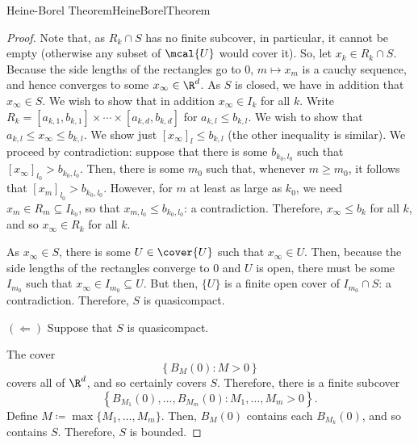 \begin{thm}{Heine-Borel Theorem}{HeineBorelTheorem}
\begin{proof}
Note that, as $R_k\cap S$ has no finite subcover, in particular, it cannot be empty (otherwise any subset of $\mcal{U}$ would cover it).  So, let $x_k\in R_k\cap S$.  Because the side lengths of the rectangles go to $0$, $m\mapsto x_m$ is a cauchy sequence, and hence converges to some $x_\infty \in \R ^d$.  As $S$ is closed, we have in addition that $x_\infty \in S$.  We wish to show that in addition $x_\infty \in I_k$ for all $k$.  Write $R_k=[a_{k,1},b_{k,1}]\times \cdots \times [a_{k,d},b_{k,d}]$ for $a_{k,l}\leq b_{k,l}$.  We wish to show that $a_{k,l}\leq x_\infty \leq b_{k,l}$.  We show just $[x_\infty] _l\leq b_{k,l}$ (the other inequality is similar).  We proceed by contradiction:  suppose that there is some $b_{k_0,l_0}$ such that $[x_\infty ]_{l_0}>b_{k_0,l_0}$.  Then, there is some $m_0$ such that, whenever $m\geq m_0$, it follows that $[x_m]_{l_0}>b_{k_0,l_0}$.  However, for $m$ at least as large as $k_0$, we need $x_m\in R_m\subseteq I_{k_0}$, so that $x_{m,l_0}\leq b_{k_0,l_0}$:  a contradiction.  Therefore, $x_\infty \leq b_k$ for all $k$, and so $x_\infty \in R_k$ for all $k$.

As $x_\infty \in S$, there is some $U\in \cover{U}$ such that $x_\infty \in U$.  Then, because the side lengths of the rectangles converge to $0$ and $U$ is open, there must be some $I_{m_0}$ such that $x_\infty \in I_{m_0}\subseteq U$.  But then, $\{ U\}$ is a finite open cover of $I_{m_0}\cap S$:  a contradiction.  Therefore, $S$ is quasicompact.

\blankline
\noindent
$(\Leftarrow )$
Suppose that $S$ is quasicompact.

The cover
\begin{equation}
\left\{ B_M(0):M>0\right\}
\end{equation}
covers all of $\R ^d$, and so certainly covers $S$.  Therefore, there is a finite subcover
\begin{equation}
\left\{ B_{M_1}(0),\ldots ,B_{M_m}(0):M_1,\ldots ,M_m>0\right\} .
\end{equation}Define $M\coloneqq \max \{ M_1,\ldots ,M_m\}$.  Then, $B_M(0)$ contains each $B_{M_k}(0)$, and so contains $S$.  Therefore, $S$ is bounded.


\end{proof}
\end{thm}
